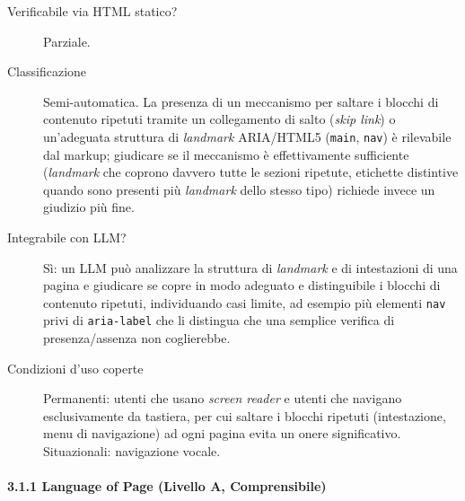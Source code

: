 \begin{description}

\item[Verificabile via HTML statico?] Parziale.

\item[Classificazione] Semi-automatica. La presenza di un meccanismo per saltare i blocchi di contenuto ripetuti tramite un collegamento di salto (\emph{skip link}) o un'adeguata struttura di \emph{landmark} ARIA/HTML5 (\texttt{main}, \texttt{nav}) è rilevabile dal markup; giudicare se il meccanismo è effettivamente sufficiente (\emph{landmark} che coprono davvero tutte le sezioni ripetute, etichette distintive quando sono presenti più \emph{landmark} dello stesso tipo) richiede invece un giudizio più fine.

\item[Integrabile con LLM?] Sì: un LLM può analizzare la struttura di \emph{landmark} e di intestazioni di una pagina e giudicare se copre in modo adeguato e distinguibile i blocchi di contenuto ripetuti, individuando casi limite, ad esempio più elementi \texttt{nav} privi di \texttt{aria-label} che li distingua che una semplice verifica di presenza/assenza non coglierebbe.

\item[Condizioni d'uso coperte] Permanenti: utenti che usano \emph{screen reader} e utenti che navigano esclusivamente da tastiera, per cui saltare i blocchi ripetuti (intestazione, menu di navigazione) ad ogni pagina evita un onere significativo. Situazionali: navigazione vocale.

\end{description}

\paragraph*{3.1.1 Language of Page (Livello A, Comprensibile)}

